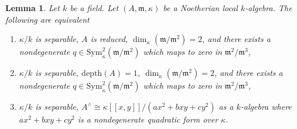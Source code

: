 \documentclass[10pt,a4paper]{amsart}
\theoremstyle{plain}
\newtheorem{lemma}[subsection]{Lemma}
\theoremstyle{definition}
\theoremstyle{remark}
\numberwithin{equation}{subsection}
\begin{document}
\begin{lemma}
\label{lemma-nodal-algebraic}
Let $k$ be a field. Let $(A, \mathfrak m, \kappa)$ be a Noetherian
local $k$-algebra. The following are equivalent
\begin{enumerate}
\item $\kappa/k$ is separable, $A$ is reduced,
$\dim_\kappa(\mathfrak m/\mathfrak m^2) = 2$, and there exists a nondegenerate
$q \in \text{Sym}^2_\kappa(\mathfrak m/\mathfrak m^2)$
which maps to zero in $\mathfrak m^2/\mathfrak m^3$,
\item $\kappa/k$ is separable, $\text{depth}(A) = 1$,
$\dim_\kappa(\mathfrak m/\mathfrak m^2) = 2$, and there exists a nondegenerate
$q \in \text{Sym}^2_\kappa(\mathfrak m/\mathfrak m^2)$
which maps to zero in $\mathfrak m^2/\mathfrak m^3$,
\item $\kappa/k$ is separable,
$A^\wedge \cong \kappa[[x, y]]/(ax^2 + bxy + cy^2)$
as a $k$-algebra where $ax^2 + bxy + cy^2$ is a nondegenerate quadratic form
over $\kappa$.
\end{enumerate}
\end{lemma}
\end{document}
